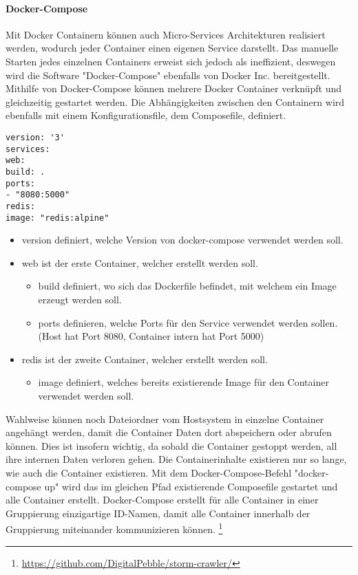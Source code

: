 \paragraph{Docker-Compose}
Mit Docker Containern können auch Micro-Services Architekturen realisiert werden, wodurch jeder Container einen eigenen Service darstellt.
Das manuelle Starten jedes einzelnen Containers erweist sich jedoch als ineffizient, deswegen wird die Software "Docker-Compose" ebenfalls von Docker Inc. bereitgestellt.
Mithilfe von Docker-Compose können mehrere Docker Container verknüpft und gleichzeitig gestartet werden.
Die Abhängigkeiten zwischen den Containern wird ebenfalls mit einem Konfigurationsfile, dem Composefile, definiert.
\begin{lstlisting}
version: '3'
services:
web:
build: .
ports:
- "8080:5000"
redis:
image: "redis:alpine"
\end{lstlisting}
\begin{itemize}
	\item version definiert, welche Version von docker-compose verwendet werden soll.
	\item web ist der erste Container, welcher erstellt werden soll.
	\begin{itemize}
		\item build definiert, wo sich das Dockerfile befindet, mit welchem ein Image erzeugt werden soll.
		\item ports definieren, welche Ports für den Service verwendet werden sollen. (Host hat Port 8080, Container intern hat Port 5000) 
	\end{itemize}
	\item redis ist der zweite Container, welcher erstellt werden soll.
	\begin{itemize}
		\item image definiert, welches bereits existierende Image für den Container verwendet werden soll.
	\end{itemize}
\end{itemize}
Wahlweise können noch Dateiordner vom Hostsystem in einzelne Container angehängt werden, damit die Container Daten dort abspeichern oder abrufen können.
Dies ist insofern wichtig, da sobald die Container gestoppt werden, all ihre internen Daten verloren gehen.
Die Containerinhalte existieren nur so lange, wie auch die Container existieren.
Mit dem Docker-Compose-Befehl "docker-compose up" wird das im gleichen Pfad existierende Composefile gestartet und alle Container erstellt.
Docker-Compose erstellt für alle Container in einer Gruppierung einzigartige ID-Namen, damit alle Container innerhalb der Gruppierung miteinander kommunizieren können.
\footnote{\url{https://github.com/DigitalPebble/storm-crawler/}}
